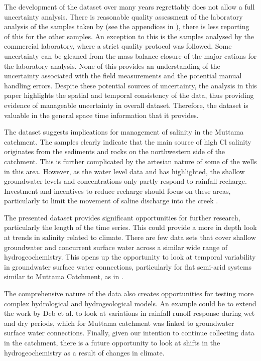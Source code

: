 \documentclass[, manuscript]{copernicus}
\begin{document}
The development of the dataset over many years regrettably does not
allow a full uncertainty analysis. There is reasonable quality
assessment of the laboratory analysis of the samples taken by
\citet{Akter2018} (see the appendices in \citet{Akter2018}), there is
less reporting of this for the other samples. An exception to this is
the samples analysed by the commercial laboratory, where a strict
quality protocol was followed. Some uncertainty can be gleaned from the
mass balance closure of the major cations for the laboratory analysis.
None of this provides an understanding of the uncertainty associated
with the field measurements and the potential manual handling errors.
Despite these potential sources of uncertainty, the analysis in this
paper highlights the spatial and temporal consistency of the data, thus
providing evidence of manageable uncertainty in overall dataset.
Therefore, the dataset is valuable in the general space time information
that it provides.

The dataset suggests implications for management of salinity in the
Muttama catchment. The samples clearly indicate that the main source of
high Cl salinity originates from the sediments and rocks on the
northwestern side of the catchment. This is further complicated by the
artesian nature of some of the wells in this area. However, as the water
level data and \citet{Akter2021} has highlighted, the shallow
groundwater levels and concentrations only partly respond to rainfall
recharge. Investment and incentives to reduce recharge should focus on
these areas, particularly to limit the movement of saline discharge into
the creek \citep{Akter2018}.

The presented dataset provides significant opportunities for further
research, particularly the length of the time series. This could provide
a more in depth look at trends in salinity related to climate. There are
few data sets that cover shallow groundwater and concurrent surface
water across a similar wide range of hydrogeochemistry. This opens up
the opportunity to look at temporal variability in groundwater surface
water connections, particularly for flat semi-arid systems similar to
Muttama Catchment, as in \citet{Akter2018}.

The comprehensive nature of the data also creates opportunities for
testing more complex hydrological and hydrogeological models. An example
could be to extend the work by Deb et al. \citep{debMuttamamodel2019} to
look at variations in rainfall runoff response during wet and dry
periods, which for Muttama catchment was linked to groundwater surface
water connections. Finally, given our intention to continue collecting
data in the catchment, there is a future opportunity to look at shifts
in the hydrogeochemistry as a result of changes in climate.
\end{document}
